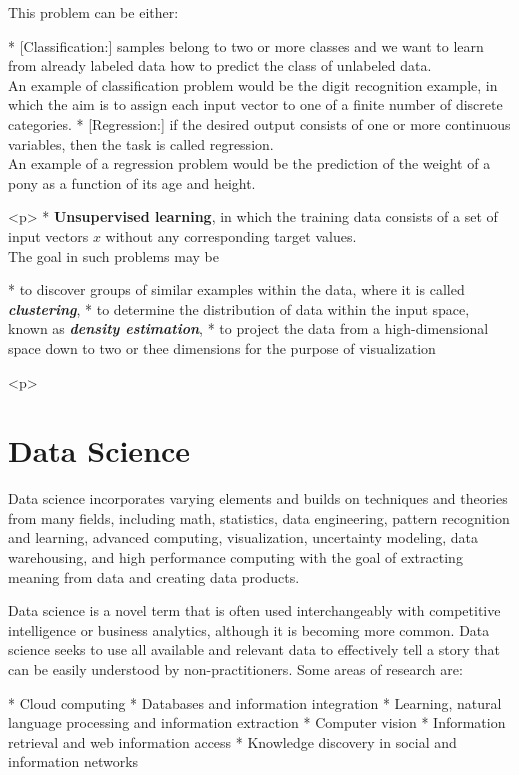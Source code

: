 This problem can be either:
\begin{description}
* [Classification:] samples belong to two or more classes and we want to learn from already labeled data how
to predict the class of unlabeled data. \\ An example of classification problem would be the digit recognition
example, in which the aim is to assign each input vector to one of a finite number of discrete categories.
* [Regression:] if the desired output consists of one or more continuous variables, then the task is called
regression. \\ An example of a regression problem would be the prediction of the weight of a pony as a
function of its age and height.

<p>
\medskip
*   \textbf{Unsupervised learning}, in which the training data consists of a set of input vectors $x$ without any corresponding
target values. \\  The goal in such problems may be

*  to discover groups of similar examples within the data, where
it is called \textbf{\textit{clustering}}, *  to determine the distribution of data within the input space, known as \textbf{\textit{density estimation}},
*  to project the data from a high-dimensional space down to two or thee dimensions for the purpose of
visualization 



<p>
\section{Data Science}
Data science incorporates varying elements and builds on techniques and theories from many fields, including math, statistics, data engineering, pattern recognition and learning, advanced computing, visualization, uncertainty modeling, data warehousing, and high performance computing with the goal of extracting meaning from data and creating data products.


Data science is a novel term that is often used interchangeably with competitive intelligence or business analytics, although it is becoming more common. Data science seeks to use all available and relevant data to effectively tell a story that can be easily understood by non-practitioners. Some areas of research are:

*   Cloud computing 
*   Databases and information integration 
*   Learning, natural language processing and information extraction 
*   Computer vision 
*   Information retrieval and web information access 
*   Knowledge discovery in social and information networks 



\end{description}

